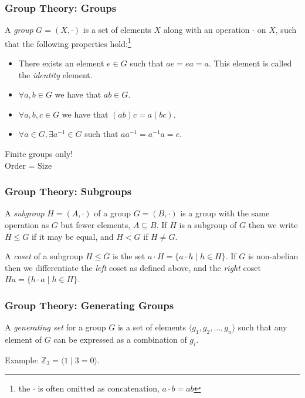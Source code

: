 \documentclass{beamer}
\newcommand{\bb}[1]{\mathbb{#1}}
\begin{document}
\begin{frame}
\frametitle{Group Theory: Groups}\label{history:group_theory}
    \begin{definition}[Group]\label{def:group}
        A \textit{group} $G = (X, \cdot)$ is a set of elements $X$ along with an operation $\cdot$ on $X$,  such that the following properties hold:\footnote{the $\cdot $ is often omitted as concatenation, $a \cdot b = ab$
        }
        \begin{itemize}
        \item There exists an element $ e \in G$ such that $ae = ea = a$. This element is called the \textit{identity} element.
        \item $\forall a, b \in G$ we have that $ab \in G$.
        \item $\forall a, b, c \in G$ we have that $(ab)c = a(bc)$.
        \item $\forall a \in G, \exists a^{-1} \in G$ such that $aa^{-1} = a^{-1} a = e$.
        \end{itemize}
    \end{definition}
    Finite groups only!\\
    Order = Size
\end{frame}

\begin{frame}
\frametitle{Group Theory: Subgroups}
    \begin{definition}[Subgroup]\label{def:subgroup}
        A \textit{subgroup} $H = (A, \cdot)$ of a group $G = (B, \cdot)$ is a group with the same operation as $G$ but fewer elements, $A \subseteq B$.
        If $H$ is a subgroup of $G$ then we write $H \leqslant G$ if it may be equal, and $H < G$ if $H \neq G$.
    \end{definition}
    \begin{definition}[Coset]\label{def:coset}
        A \textit{coset} of a subgroup $H \leqslant G$ is the set $a \cdot H = \{a \cdot h \mid h \in H\}$. If $G$ is non-abelian then we differentiate the \textit{left} coset as defined above, and the \textit{right} coset $Ha = \{h \cdot a \mid h \in H\}$.
    \end{definition}
\end{frame}

\begin{frame}
\frametitle{Group Theory: Generating Groups}
        \begin{definition}\label{def:generating_set}
                A \textit{generating set} for a group $G$ is a set of elements $\langle g_1, g_2, \dots, g_n \rangle$ such that any element of $G$ can be expressed as a combination of $g_i$.
        \end{definition}

        Example: $\bb{Z}_3 = \langle 1 \mid 3 = 0\rangle$.
\end{frame}
\end{document}
